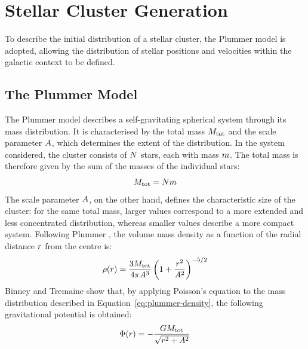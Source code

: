 \section{Stellar Cluster Generation}
\label{sec:generazione-ammasso}
To describe the initial distribution of a
stellar cluster, the Plummer model \cite{plummer1911}
is adopted, allowing the distribution of stellar
positions and velocities within the galactic context to be defined.

\subsection{The Plummer Model}
\label{subsec:plummer}
The Plummer model describes a self-gravitating spherical system through its mass distribution. It is characterised by the total mass $M_{\mathrm{tot}}$ and the scale parameter $A$, which determines the extent of the distribution. In the system considered, the cluster consists of $N$ stars, each with mass $m$. The total mass is therefore given by the sum of the masses of the individual stars:
\begin{equation}
	M_{\mathrm{tot}} = N m
	\label{eq:total-cluster-mass}
\end{equation}
The scale parameter $A$, on the other hand, defines the characteristic size of the cluster: for the same total mass, larger values correspond to a more extended and less concentrated distribution, whereas smaller values describe a more compact system.
Following Plummer \cite{plummer1911}, the volume mass density as a function of the radial distance $r$ from the centre is:
\begin{equation}
	\rho(r) =
	\frac{3M_{\mathrm{tot}}}{4\pi A^3}
	\left(1+\frac{r^2}{A^2}\right)^{-5/2}
	\label{eq:plummer-density}
\end{equation}
Binney and Tremaine \cite{binneytremaine2008} show that, by applying Poisson's equation to the mass distribution described in Equation~\eqref{eq:plummer-density}, the following gravitational potential is obtained:
\begin{equation}
	\Phi(r) =
	-\frac{GM_{\mathrm{tot}}}
	{\sqrt{r^2+A^2}}
	\label{eq:plummer-potential}
\end{equation}
